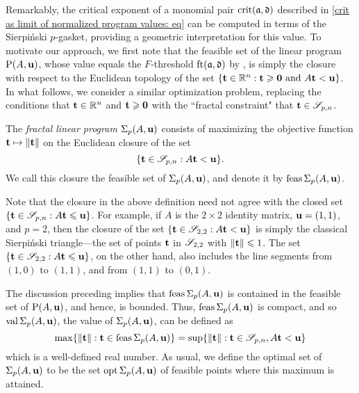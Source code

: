 \documentclass[11pt]{amsart}
\begin{document}
Remarkably, the critical exponent of a monomial pair $\operatorname{crit}(\mathfrak{a}, \mathfrak{d})$ described in \eqref{crit as limit of normalized program values: eq} can be computed in terms of the Sierpi\'nski $p$-gasket, providing a geometric interpretation for this value.  To motivate our approach, we first note that the feasible set of the linear program $\mathrm{P}(A, \mathbf{u})$, whose value equals the $F$-threshold $\operatorname{ft}(\mathfrak{a}, \mathfrak{d})$ by , is simply the closure with respect to the Euclidean topology of the set $\{ \mathbf{t} \in \mathbb{R}^n : \mathbf{t} \geqslant \mathbf{0} \text{ and } A\mathbf{t} < \mathbf{u} \}$.  In what follows, we consider a similar optimization problem,  replacing the conditions that $\mathbf{t} \in \mathbb{R}^n$ and $\mathbf{t} \geqslant \mathbf{0}$ with the ``fractal constraint" that $\mathbf{t} \in \mathscr{S}_{p,n}$.

\begin{definition}
\label{fractal program: D}
The \emph{fractal linear program} $\Sigma_p(A,\mathbf{u})$ consists of maximizing the objective function $\mathbf{t}\mapsto \| \mathbf{t} \|$ on the Euclidean closure of the set \[ \{ \mathbf{t} \in \mathscr{S}_{p,n} : A \mathbf{t} < \mathbf{u} \}.\]  We call this closure the feasible set of $\Sigma_p(A, \mathbf{u})$, and denote it by $\operatorname{feas} \Sigma_p(A, \mathbf{u})$.
\end{definition}

\begin{remark}
   Note that the closure in the above definition need not agree with the closed set $\{ \mathbf{t} \in \mathscr{S}_{p,n} : A \mathbf{t} \leqslant \mathbf{u} \}$.
   For example, if $A$ is the $2\times 2$ identity matrix, $\mathbf{u} = (1,1)$, and $p=2$, then the closure of the set $\{ \mathbf{t} \in \mathscr{S}_{2,2} : A \mathbf{t} < \mathbf{u} \}$ is simply the classical Sierpi\'nski triangle---the set of points $\mathbf{t}$ in $\mathscr{S}_{2,2}$ with $\| \mathbf{t} \| \leqslant 1$. The set $\{ \mathbf{t} \in \mathscr{S}_{2,2} : A \mathbf{t} \leqslant \mathbf{u} \}$, on the other hand, also includes the line segments from $(1,0)$ to $(1,1)$, and from $(1,1)$ to $(0,1)$.
\end{remark}

\begin{remark}  The discussion preceding  implies that $\operatorname{feas} \Sigma_p(A, \mathbf{u})$ is contained in the feasible set of $\mathrm{P}(A, \mathbf{u})$, and hence, is bounded.  Thus, $\operatorname{feas} \Sigma_p(A, \mathbf{u})$ is compact, and so $\operatorname{val} \Sigma_p(A, \mathbf{u})$, the value of $\Sigma_p(A, \mathbf{u})$, can be defined as 
   \[ \max \{ \| \mathbf{t} \|: \mathbf{t} \in \operatorname{feas} \Sigma_p(A, \mathbf{u}) \} = \sup \{ \| \mathbf{t} \| : \mathbf{t} \in \mathscr{S}_{p,n}, A \mathbf{t} < \mathbf{u} \} \] which is a well-defined real number.
   As usual, we define the optimal set of $\Sigma_p(A, \mathbf{u})$ to be the set $\operatorname{opt} \Sigma_p(A, \mathbf{u})$ of feasible points where this maximum is attained.
\end{remark}
\end{document}
